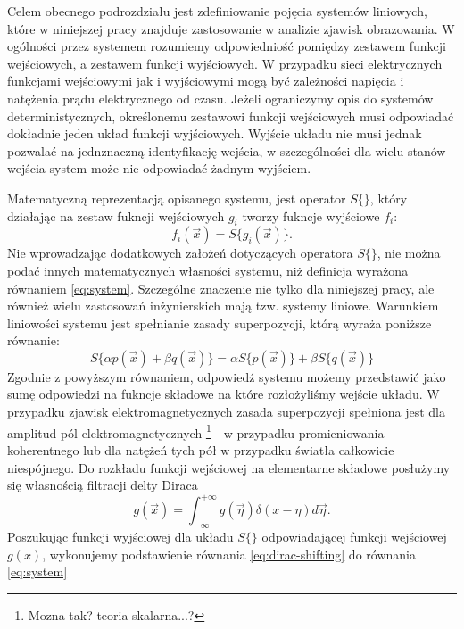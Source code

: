 Celem obecnego podrozdziału jest zdefiniowanie pojęcia systemów liniowych, które w niniejszej pracy znajduje zastosowanie w analizie zjawisk obrazowania. W ogólności przez systemem rozumiemy odpowiedniość pomiędzy zestawem funkcji wejściowych, a zestawem funkcji wyjściowych. W przypadku sieci elektrycznych funkcjami wejściowymi jak i wyjściowymi mogą być zależności napięcia i natężenia prądu elektrycznego od czasu. Jeżeli ograniczymy opis do systemów deterministycznych, określonemu zestawowi funkcji wejściowych musi odpowiadać dokładnie jeden układ funkcji wyjściowych. Wyjście układu nie musi jednak pozwalać na jednznaczną identyfikację wejścia, w szczególności dla wielu stanów wejścia system może nie odpowiadać żadnym wyjściem.

\label{art:lsi}

Matematyczną reprezentacją opisanego systemu, jest operator $S\{\}$, który działając na zestaw fukncji wejściowych $g_i$ tworzy fukncje wyjściowe $f_i$:
\begin{equation}
f_i(\vec{x})=S\{g_i(\vec{x})\}.
\label{eq:system}
\end{equation} 
Nie wprowadzając dodatkowych założeń dotyczących operatora $S\{\}$, nie można podać innych matematycznych własności systemu, niż definicja wyrażona równaniem \ref{eq:system}. Szczególne znaczenie nie tylko dla niniejszej pracy, ale również wielu zastosowań inżynierskich mają tzw. systemy liniowe. Warunkiem liniowości systemu jest spełnianie zasady superpozycji, którą wyraża poniższe równanie:
\begin{equation}
S\{\alpha p(\vec{x}) + \beta q(\vec{x})\} = \alpha S\{p(\vec{x})\} + \beta S\{q(\vec{x})\}
\label{eq:lin-system}
\end{equation}
Zgodnie z powyższym równaniem, odpowiedź systemu możemy przedstawić jako sumę odpowiedzi na fukncje składowe na które rozłożyliśmy wejście układu. W przypadku zjawisk elektromagnetycznych zasada superpozycji spełniona jest dla amplitud pól elektromagnetycznych \footnote{Mozna tak? teoria skalarna...?} - w przypadku promieniowania koherentnego lub dla natężeń tych pół w przypadku światła całkowicie niespójnego.  Do rozkładu funkcji wejściowej na elementarne składowe posłużymy się własnością filtracji delty Diraca
\begin{equation}
g(\vec{x})=\int_{-\infty}^{+\infty} g(\vec{\eta}) \delta(x-\eta) d \vec{\eta}.
\label{eq:dirac-shifting}
\end{equation}
Poszukując funkcji wyjściowej dla układu $S\{\}$ odpowiadającej funkcji wejściowej $g(x)$, wykonujemy podstawienie równania \ref{eq:dirac-shifting} do równania \ref{eq:system} 
